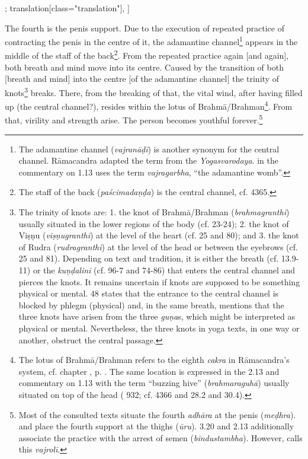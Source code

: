 \begin{alignment}[
  texts=edition[class="edition"];
  translation[class="translation"],
  ]
\begin{translation}
\begin{tlate}
      The fourth is the penis support. Due to the execution of repeated practice of contracting the penis in the centre of it, the adamantine channel\footnote{The adamantine channel (\textit{vajranāḍī}) is another synonym for the central channel. Rāmacandra adapted the term from the \textit{Yogasvarodaya}.  in the commentary on 1.13 uses the term \textit{vajragarbha}, ``the adamantine womb''.} appears in the middle of the staff of the back\footnote{The staff of the back (\textit{paścimadaṇḍa}) is the central channel, cf.  4365.}. From the repeated practice again [and again], both breath and mind move into its centre. Caused by the transition of both [breath and mind] into the centre [of the adamantine channel] the trinity of knots\footnote{The trinity of knots are: 1. the knot of Brahmā/Brahman (\textit{brahmagranthi}) usually situated in the lower regions of the body (cf.  23-24); 2. the knot of Viṣṇu (\textit{viṣṇugranthi}) at the level of the heart (cf.  25 and  80); and 3. the knot of Rudra (\textit{rudragranthi}) at the level of the head or between the eyebrows (cf.  25 and  81). Depending on text and tradition, it is either the breath (cf.  13.9-11) or the \textit{kuṇḍalinī} (cf.  96-7 and  74-86) that enters the central channel and pierces the knots. It remains uncertain if knots are supposed to be something physical or mental.  48 states that the entrance to the central channel is blocked by phlegm (physical) and, in the same breath, mentions that the three knots have arisen from the three \textit{guṇa}s, which might be interpreted as physical or mental. Nevertheless, the three knots in yoga texts, in one way or another, obstruct the central passage.} breaks. There, from the breaking of that, the vital wind, after having filled up (the central channel?), resides within the lotus of Brahmā/Brahman\footnote{The lotus of Brahmā/Brahman refers to the eighth \textit{cakra} in Rāmacandra's system, cf. chapter , p. \pageref{cakra8}. The same location is expressed in the  2.13 and  commentary on 1.13 with the term ``buzzing hive'' (\textit{brahmaraguhā}) usually situated on top of the head ( 932; cf.  4366 and  28.2 and 30.4).}. From that, virility and strength arise. The person becomes youthful forever.\footnote{Most of the consulted texts situate the fourth \textit{adhāra} at the penis (\textit{meḍhra}).  and  place the fourth support at the thighs (\textit{ūru}).  3.20 and  2.13 additionally associate the practice with the arrest of semen (\textit{bindustambha}). However,  calls this \textit{vajrolī}.} %

\end{tlate}
\end{translation}
\end{alignment}
